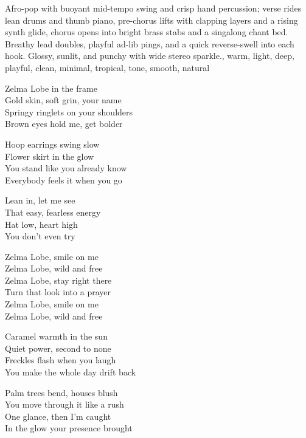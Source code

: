 

\begin{notes}
\end{notes}
\begin{style}
Afro-pop with buoyant mid-tempo swing and crisp hand percussion; verse rides lean drums and thumb piano, pre-chorus lifts with clapping layers and a rising synth glide, chorus opens into bright brass stabs and a singalong chant bed. %
Breathy lead doubles, playful ad-lib pings, and a quick reverse-swell into each hook. %
Glossy, sunlit, and punchy with wide stereo sparkle., warm, light, deep, playful, clean, minimal, tropical, tone, smooth, natural
\end{style}
\begin{lyrics}
Zelma Lobe in the frame\\
Gold skin, soft grin, your name\\
Springy ringlets on your shoulders\\
Brown eyes hold me, get bolder

Hoop earrings swing slow\\
Flower skirt in the glow\\
You stand like you already know\\
Everybody feels it when you go

Lean in, let me see\\
That easy, fearless energy\\
Hat low, heart high\\
You don’t even try

Zelma Lobe, smile on me\\
Zelma Lobe, wild and free\\
Zelma Lobe, stay right there\\
Turn that look into a prayer\\
Zelma Lobe, smile on me\\
Zelma Lobe, wild and free

Caramel warmth in the sun\\
Quiet power, second to none\\
Freckles flash when you laugh\\
You make the whole day drift back

Palm trees bend, houses blush\\
You move through it like a rush\\
One glance, then I’m caught\\
In the glow your presence brought


\end{lyrics}
